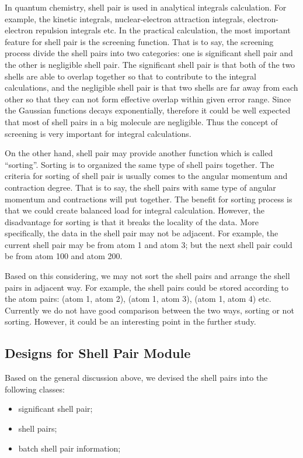 In quantum chemistry, shell pair is used in analytical integrals calculation. For 
example, the kinetic integrals, nuclear-electron attraction integrals, electron-
electron repulsion integrals etc. In the practical calculation, the most important
feature for shell pair is the screening function. That is to say, the screening 
process divide the shell pairs into two categories: one is significant shell pair
and the other is negligible shell pair. The significant shell pair is that both
of the two shells are able to overlap together so that to contribute to the integral
calculations, and the negligible shell pair is that two shells are far away from each
other so that they can not form effective overlap within given error range. Since
the Gaussian functions decays exponentially, therefore it could be well expected 
that most of shell pairs in a big molecule are negligible. Thus the concept of 
screening is very important for integral calculations.
  
On the other hand, shell pair may provide another function which is called ``sorting''.
Sorting is to organized the same type of shell pairs together. The criteria for sorting
of shell pair is usually comes to the angular momentum and contraction degree. That
is to say, the shell pairs with same type of angular momentum and contractions will
put together. The benefit for sorting process is that we could create balanced load
for integral calculation. However, the disadvantage for sorting is that it breaks the 
locality of the data. More specifically, the data in the shell pair may not be adjacent.
For example, the current shell pair may be from atom 1 and atom 3; but the next shell 
pair could be from atom 100 and atom 200. 
  
Based on this considering, we may not sort the shell pairs and arrange the shell pairs 
in adjacent way. For example, the shell pairs could be stored according to the atom 
pairs: (atom 1, atom 2), (atom 1, atom 3), (atom 1, atom 4) etc. Currently we do not have
good comparison between the two ways, sorting or not sorting. However, it could be 
an interesting point in the further study.
 
\subsection{Designs for Shell Pair Module}
  
Based on the general discussion above, we devised the shell pairs into the following
classes:
\begin{itemize}
  \item significant shell pair;
  \item shell pairs;
  \item batch shell pair information;
\end{itemize}
  
